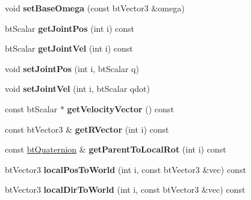 \begin{DoxyCompactItemize}
\item 
\hypertarget{classbt_multi_body_a56c0cf6a7bfccf1d3512933955d5127f}{void {\bfseries set\+Base\+Omega} (const bt\+Vector3 \&omega)}\label{classbt_multi_body_a56c0cf6a7bfccf1d3512933955d5127f}

\item 
\hypertarget{classbt_multi_body_ad3f3b5b349ec09f11ec7328938e7fb73}{bt\+Scalar {\bfseries get\+Joint\+Pos} (int i) const }\label{classbt_multi_body_ad3f3b5b349ec09f11ec7328938e7fb73}

\item 
\hypertarget{classbt_multi_body_aa7f3c238920519e388421ed1cc450826}{bt\+Scalar {\bfseries get\+Joint\+Vel} (int i) const }\label{classbt_multi_body_aa7f3c238920519e388421ed1cc450826}

\item 
\hypertarget{classbt_multi_body_aad8bd57ac6615edfc1a50502d9cb78c2}{void {\bfseries set\+Joint\+Pos} (int i, bt\+Scalar q)}\label{classbt_multi_body_aad8bd57ac6615edfc1a50502d9cb78c2}

\item 
\hypertarget{classbt_multi_body_a8c16a6fdd585bfb3759757f4fe80f16a}{void {\bfseries set\+Joint\+Vel} (int i, bt\+Scalar qdot)}\label{classbt_multi_body_a8c16a6fdd585bfb3759757f4fe80f16a}

\item 
\hypertarget{classbt_multi_body_a5a024ce75818ebaf721232dbeedc80c2}{const bt\+Scalar $\ast$ {\bfseries get\+Velocity\+Vector} () const }\label{classbt_multi_body_a5a024ce75818ebaf721232dbeedc80c2}

\item 
\hypertarget{classbt_multi_body_a57f95d468657616c9ae682fafb94b225}{const bt\+Vector3 \& {\bfseries get\+R\+Vector} (int i) const }\label{classbt_multi_body_a57f95d468657616c9ae682fafb94b225}

\item 
\hypertarget{classbt_multi_body_a6e6d4761a395a904ab834cdace799e12}{const \hyperlink{classbt_quaternion}{bt\+Quaternion} \& {\bfseries get\+Parent\+To\+Local\+Rot} (int i) const }\label{classbt_multi_body_a6e6d4761a395a904ab834cdace799e12}

\item 
\hypertarget{classbt_multi_body_aa6a202b1ee969f93856cec661bcbb487}{bt\+Vector3 {\bfseries local\+Pos\+To\+World} (int i, const bt\+Vector3 \&vec) const }\label{classbt_multi_body_aa6a202b1ee969f93856cec661bcbb487}

\item 
\hypertarget{classbt_multi_body_ad58277e0f8a7a8073c5be98702354ffa}{bt\+Vector3 {\bfseries local\+Dir\+To\+World} (int i, const bt\+Vector3 \&vec) const }\label{classbt_multi_body_ad58277e0f8a7a8073c5be98702354ffa}


\end{DoxyCompactItemize}

